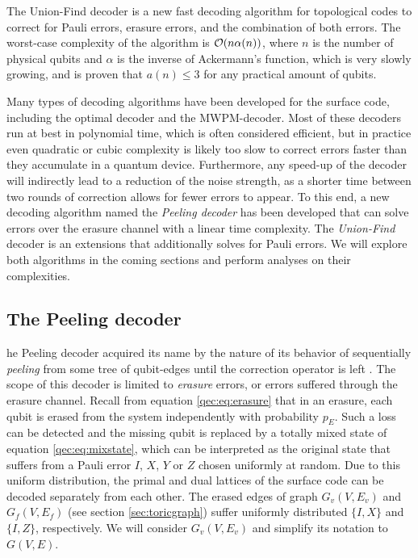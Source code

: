 The Union-Find decoder is a new fast decoding algorithm for topological codes to correct for Pauli errors, erasure errors, and the combination of both errors. The worst-case complexity of the algorithm is $\mathcal{O}(n\alpha(n))$, where $n$ is the number of physical qubits and $\alpha$ is the inverse of Ackermann's function, which is very slowly growing, and is proven that $a(n)\leq 3$ for any practical amount of qubits.

Many types of decoding algorithms have been developed for the surface code, including the optimal decoder and the MWPM-decoder. Most of these decoders run at best in polynomial time, which is often considered efficient, but in practice even quadratic or cubic complexity is likely too slow to correct errors faster than they accumulate in a quantum device. Furthermore, any speed-up of the decoder will indirectly lead to a reduction of the noise strength, as a shorter time between two rounds of correction allows for fewer errors to appear. To this end, a new decoding algorithm named the \emph{Peeling decoder} has been developed that can solve errors over the erasure channel with a linear time complexity. The \emph{Union-Find} decoder is an extensions that additionally solves for Pauli errors. We will explore both algorithms in the coming sections and perform analyses on their complexities. 

\subsection{The Peeling decoder}
he Peeling decoder acquired its name by the nature of its behavior of sequentially \emph{peeling} from some tree of qubit-edges until the correction operator is left \cite{delfosse2017linear}. The scope of this decoder is limited to \emph{erasure} errors, or errors suffered through the erasure channel. Recall from equation \ref{qec:eq:erasure} that in an erasure, each qubit is erased from the system independently with probability $p_E$. Such a loss can be detected and the missing qubit is replaced by a totally mixed state of equation \ref{qec:eq:mixstate}, which can be interpreted as the original state that suffers from a Pauli error $I$, $X$, $Y$ or $Z$ chosen uniformly at random. Due to this uniform distribution, the primal and dual lattices of the surface code can be decoded separately from each other. The erased edges of graph $G_v(V,E_v)$ and $G_f(V,E_f)$ (see section \ref{sec:toricgraph}) suffer uniformly distributed $\{I,X\}$ and $\{I,Z\}$, respectively. We will consider $G_v(V,E_v)$ and simplify its notation to $G(V,E)$. 

